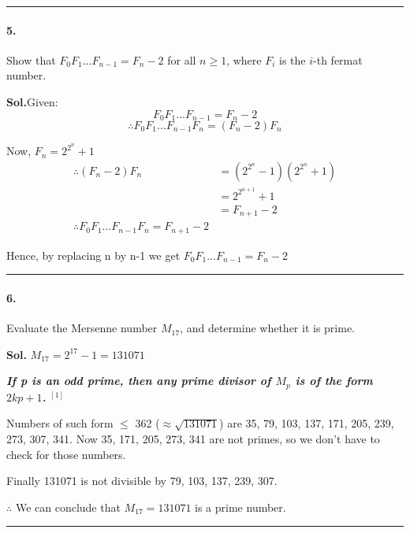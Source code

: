 \documentclass[12pt,oneside,reqno]{amsart}
\begin{document}
\par\noindent\textcolor{gray}{\rule{\textwidth}{0.5pt}}
\smallskip

\paragraph*{5.} Show that $F_0F_1 . . . F_{n-1} = F_n - 2$ for all $n \ge 1$, where $F_i$ is the $i$-th fermat number.

\bigskip
\textbf{Sol.}Given:
$$
F_0F_1 . . . F_{n-1} = F_n - 2
$$
$$
\therefore F_0F_1 . . . F_{n-1}F_n = (F_n - 2)F_n
$$

Now, $F_n = 2^{2^n} + 1$
\begin{align*}
    \therefore (F_n - 2)F_n &= (2^{2^n} - 1)(2^{2^n} + 1) \\
                            &= 2^{2^{n+1}} + 1 \\
                            &= F_{n+1} - 2 \\
    \therefore \boxed{F_0F_1 . . . F_{n-1}F_n = F_{n+1} - 2}
\end{align*}

Hence, by replacing n by n-1 we get $F_0F_1 . . . F_{n-1} = F_{n} - 2$

\par\noindent\textcolor{gray}{\rule{\textwidth}{0.5pt}}
\smallskip

\paragraph*{6.} Evaluate the Mersenne number $M_{17}$, and determine whether it is prime.

\bigskip
\textbf{Sol.}
$M_{17} = 2^{17} - 1 = 131071$

\textbf{\textit{ If p is an odd prime, then any prime divisor of $M_p$ is of the form $2kp+1$.}} \href{https://math.ucr.edu/~res/math153-2019/history11a.pdf}{$^{[1]}$}

\smallskip
Numbers of such form $\le$ 362 ($\approx \sqrt{131071}$) are 35, 79, 103, 137, 171, 205, 239, 273, 307, 341. Now 35, 171, 205, 273, 341 are not primes, so we don't have to check for those numbers.

\smallskip
Finally 131071 is not divisible by 79, 103, 137, 239, 307.

$\therefore$ We can conclude that $M_{17} = 131071$ is a prime number.

\par\noindent\textcolor{gray}{\rule{\textwidth}{0.5pt}}
\smallskip
\end{document}
